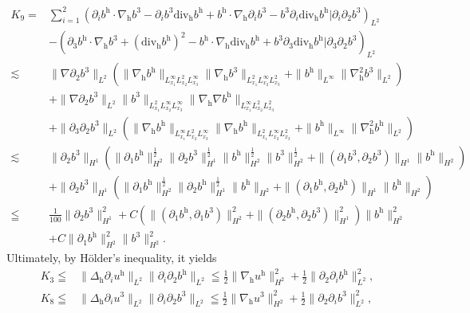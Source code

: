 \documentclass[11pt]{amsart}
\theoremstyle{definition}
\newcommand{\h}{\mathrm{h}}
\newcommand{\nablah}{\nabla_{\mathrm{h}}}
\numberwithin{equation}{section}
\begin{document}
\begin{align}\label{K9}
	K_{9}=&\sum_{i=1}^{2}
	\left(\partial_{i}b^\mathrm{h}\cdot\nabla_{\mathrm{h}}b^3-\partial_{i}b^3\mathrm{div_h}b^\mathrm{h}+b^\mathrm{h}\cdot\nabla_{\mathrm{h}}\partial_{i}b^3-b^3\partial_{i}\mathrm{div_h}b^\mathrm{h}|\partial_{i}\partial_{2}b^3\right)_{L^2}\nonumber\\
	&-\left(\partial_{3}b^\mathrm{h}\cdot\nabla_{\mathrm{h}}b^3+(\mathrm{div_h}b^\h)^2-b^\mathrm{h}\cdot\nabla_{\mathrm{h}}\mathrm{div_h}b^\h+b^3\partial_{3}\mathrm{div_h}b^\h|\partial_3\partial_{2}b^3\right)_{L^2}\nonumber\\
	\lesssim &\|\nabla\partial_{2}b^3\|_{L^2}\left(\|\nabla_\h b^\mathrm{h}\|_{L^\infty_{x_1}L^2_{x_2}L^\infty_{x_3}}\|\nabla_{\mathrm{h}}b^3\|_{L^2_{x_1}L^\infty_{x_2}L^2_{x_3}}+\|b^\mathrm{h}\|_{L^\infty}\|\nabla_{\mathrm{h}}^2b^3\|_{L^2}\right)\nonumber\\
	&+\|\nabla\partial_{2}b^3\|_{L^2}\|b^3\|_{L^2_{x_1}L^\infty_{x_2}L^\infty_{x_3}}\|\nabla_\h\nabla b^\h\|_{L^\infty_{x_1}L^2_{x_2}L^2_{x_3}}\nonumber\\
	&+\|\partial_3\partial_{2}b^3\|_{L^2}\left(\|\nabla_\h b^\mathrm{h}\|_{L^\infty_{x_1}L^2_{x_2}L^\infty_{x_3}}\|\nabla_{\mathrm{h}}b^\h\|_{L^2_{x_1}L^\infty_{x_2}L^2_{x_3}}+\|b^\mathrm{h}\|_{L^\infty}\|\nabla_{\mathrm{h}}^2b^\h\|_{L^2}\right)\nonumber\\
	\lesssim&\|\partial_{2}b^3\|_{H^1}\left(\|\partial_1 b^\mathrm{h}\|_{H^2}^\frac12\|\partial_2 b^3\|_{H^1}^\frac12\|b^\h\|_{H^2}^\frac12\|b^3\|_{H^2}^\frac12+\|(\partial_1b^3,\partial_2b^3)\|_{H^1}\|b^\mathrm{h}\|_{H^2}\right)\nonumber\\
	&+\|\partial_{2}b^3\|_{H^1}\left(\|\partial_1 b^\mathrm{h}\|_{H^2}^\frac12\|\partial_2 b^\h\|_{H^1}^\frac12\|b^\h\|_{H^2}+\|(\partial_1b^\h,\partial_2b^\h)\|_{H^1}\|b^\mathrm{h}\|_{H^2}\right)\nonumber\\
	\leqq& \frac{1}{100}\|\partial_{2}b^3\|_{H^1}^2+C\left(\|(\partial_1 b^\mathrm{h},\partial_1 b^3)\|_{H^2}^2+\|(\partial_2 b^\h,\partial_2 b^3)\|_{H^1}^2\right)\|b^\h\|_{H^2}^2\nonumber\\
	&+C\|\partial_1 b^\mathrm{h}\|_{H^2}^2\|b^3\|_{H^2}^2.
\end{align}
Ultimately, by H\"older's inequality, it yields
\begin{align}\label{K3}
	K_3\leqq &\|\Delta_{\mathrm{h}}\partial_{i}u^\h\|_{L^2}\|\partial_{i}\partial_{2}b^\h\|_{L^2}\leqq \frac12\|\nablah u^\h\|_{H^2}^2+\frac12\|\partial_{2}\partial_ib^\h\|_{L^2}^2,\\\label{K8}
	K_8\leqq &\|\Delta_{\mathrm{h}}\partial_{i}u^3\|_{L^2}\|\partial_{i}\partial_{2}b^3\|_{L^2}\leqq \frac12\|\nablah u^3\|_{H^2}^2+\frac12\|\partial_{2}\partial_ib^3\|_{L^2}^2,
\end{align}
\end{document}
